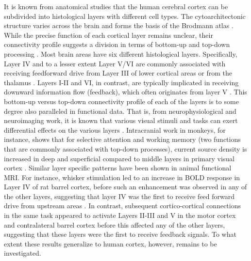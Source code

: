 \documentclass[9pt,lineno]{aperture}
\begin{document}
It is known from anatomical studies that the human cerebral cortex can be subdivided into histological layers with different cell types. The cytoarchitectonic structure varies across the brain and forms the basis of the Brodmann atlas \citep{Brodmann1909}. While the precise function of each cortical layer remains unclear, their connectivity profile suggests a division in terms of bottom-up and top-down processing \citep{Felleman1991,Barone2000,Shipp2016}. Most brain areas have six different histological layers. Specifically, Layer IV and to a lesser extent Layer V/VI are commonly associated with receiving feedforward drive from Layer III of lower cortical areas or from the thalamus \citep{Jones1998,Constantinople2013}. Layers I-II and VI, in contrast, are typically implicated in receiving downward information flow (feedback), which often originates from layer V \citep{Alitto2003}. This bottom-up versus top-down connectivity profile of each of the layers is to some degree also paralleled in functional data. That is, from neurophysiological and neuroimaging work, it is known that various visual stimuli and tasks can exert differential effects on the various layers \citep{Maier2010,Xing2012,Self2013,VelezFort2014, OHerron2016}. Intracranial work in monkeys, for instance, shows that for selective attention and working memory (two functions that are commonly associated with top-down processes), current source density is increased in deep and superficial compared to middle layers in primary visual cortex \citep{VanKerkoerle2017}. Similar layer specific patterns have been shown in animal functional MRI. For instance, whisker stimulation led to an increase in BOLD response in Layer IV of rat barrel cortex, before such an enhancement was observed in any of the other layers, suggesting that layer IV was the first to receive feed forward drive from upstream areas \citep{Yu2014}. In contrast, subsequent cortico-cortical connections in the same task appeared to activate Layers II-III and V in the motor cortex and contralateral barrel cortex before this affected any of the other layers, suggesting that these layers were the first to receive feedback signals. To what extent these results generalize to human cortex, however, remains to be investigated.
\end{document}
